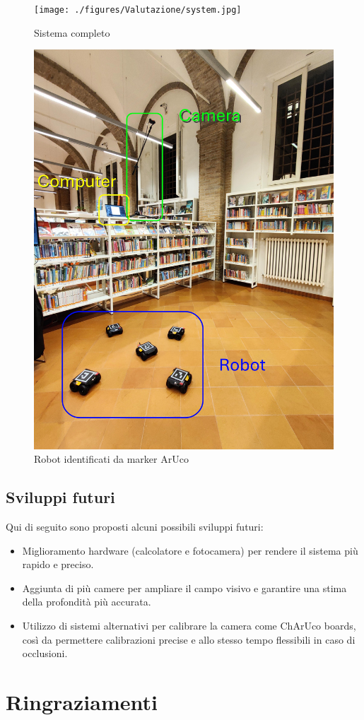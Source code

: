 \documentclass[12pt,a4paper,openright,twoside]{book}
\begin{document}
\begin{figure}[h!]
	\centering
	\texttt{[image: ./figures/Valutazione/system.jpg]}
	\caption{Sistema completo}
	\label{fig:system}
\end{figure}

\begin{figure}[h!]
	\centering
	\includegraphics[width=0.6\linewidth]{./figures/Valutazione/robot1.jpg}
	\caption{Robot identificati da marker ArUco}
	\label{fig:robot}
\end{figure}

\section{Sviluppi futuri}
Qui di seguito sono proposti alcuni possibili sviluppi futuri:
\begin{itemize}
	\item Miglioramento hardware (calcolatore e fotocamera) per rendere il sistema più rapido e preciso.
	\item Aggiunta di più camere per ampliare il campo visivo e garantire una stima della profondità più accurata.
	\item Utilizzo di sistemi alternativi per calibrare la camera come ChArUco boards, così da permettere calibrazioni precise e allo stesso tempo flessibili in caso di occlusioni.
\end{itemize}
\chapter*{Ringraziamenti}


\backmatter

\printglossary[type=\acronymtype]
\printglossary
\printbibliography
\end{document}
